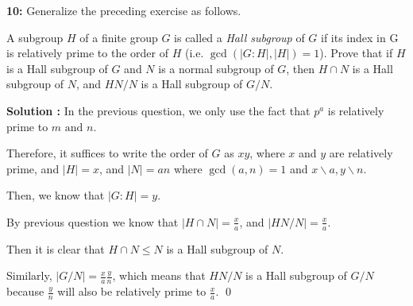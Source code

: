 \documentclass[11pt]{article}
\newcommand{\AND}{\text{ and }}
\newenvironment{exercise}[1]
	{\noindent \textbf{#1:}}
	{\par \vspace{0.5\baselineskip}}
\newenvironment{solution}[1][\unskip]
	{\noindent \textbf{Solution #1:} }
	{\qed \pagebreak}
\begin{document}
\begin{exercise}{10}
	Generalize the preceding exercise as follows.

	A subgroup $H$ of a finite group $G$ is called a \textit{Hall subgroup}
	of $G$ if its index in G is relatively prime to the order of $H$ 
	(i.e. $\operatorname{gcd}(|G:H|,|H|)=1$).
	Prove that if $H$ is a Hall subgroup of $G$ and $N$ is a normal subgroup of $G$,
	then $H \cap N$ is a Hall subgroup of $N$, and $HN/N$ is a Hall subgroup of $G / N$.
\end{exercise}

\begin{solution}
	In the previous question, we only use the fact
	that $p^a$ is relatively prime to $m \AND n$.

	Therefore, it suffices to write the order of $G$ as $xy$,
	where $x$ and $y$ are relatively prime, and $|H| = x$,
	and $|N| = an$ where $\operatorname{gcd}(a,n)=1$ and $x\backslash a, y\backslash n$.

	Then, we know that $|G:H| = y$.

	By previous question we know that $|H \cap N| = \frac{x}{a}$,
	and $|HN / N| = \frac{x}{a}$.

	Then it is clear that $H \cap N \leqslant N$ is a 
	Hall subgroup of $N$.

	Similarly, $|G / N| = \frac{x}{a} \frac{y}{n}$,
	which means that $HN / N$ is a Hall subgroup of $G / N$
	because $\frac{y}{n}$ will also be relatively prime to $\frac{x}{a}$.
\end{solution}
\end{document}
